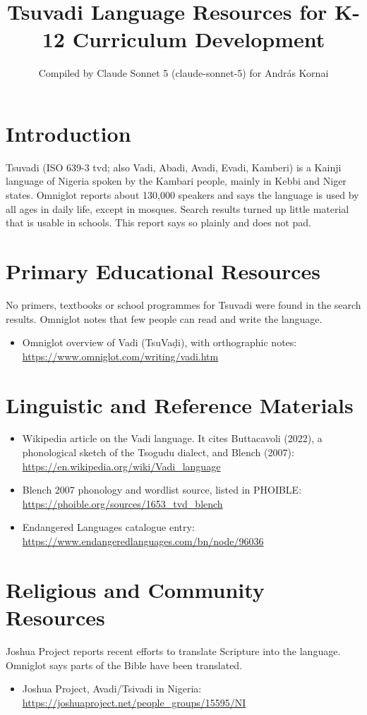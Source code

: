 \documentclass[12pt]{article}
\title{Tsuvadi Language Resources for K-12 Curriculum Development}
\author{Compiled by Claude Sonnet 5 (claude-sonnet-5) for Andr\'as Kornai}
\date{}
\begin{document}
\maketitle

\section{Introduction}
Tsuvadi (ISO 639-3 tvd; also Vadi, Abadi, Avadi, Evadi, Kamberi) is a Kainji language of Nigeria spoken by the Kambari people, mainly in Kebbi and Niger states. Omniglot reports about 130,000 speakers and says the language is used by all ages in daily life, except in mosques. Search results turned up little material that is usable in schools. This report says so plainly and does not pad.

\section{Primary Educational Resources}
No primers, textbooks or school programmes for Tsuvadi were found in the search results. Omniglot notes that few people can read and write the language.
\begin{itemize}
\item Omniglot overview of Vadi (TsuVa\d{d}i), with orthographic notes: \url{https://www.omniglot.com/writing/vadi.htm}
\end{itemize}

\section{Linguistic and Reference Materials}
\begin{itemize}
\item Wikipedia article on the Vadi language. It cites Buttacavoli (2022), a phonological sketch of the Tsogudu dialect, and Blench (2007): \url{https://en.wikipedia.org/wiki/Vadi_language}
\item Blench 2007 phonology and wordlist source, listed in PHOIBLE: \url{https://phoible.org/sources/1653_tvd_blench}
\item Endangered Languages catalogue entry: \url{https://www.endangeredlanguages.com/bn/node/96036}
\end{itemize}

\section{Religious and Community Resources}
Joshua Project reports recent efforts to translate Scripture into the language. Omniglot says parts of the Bible have been translated.
\begin{itemize}
\item Joshua Project, Avadi/Tsivadi in Nigeria: \url{https://joshuaproject.net/people_groups/15595/NI}
\end{itemize}
\end{document}
